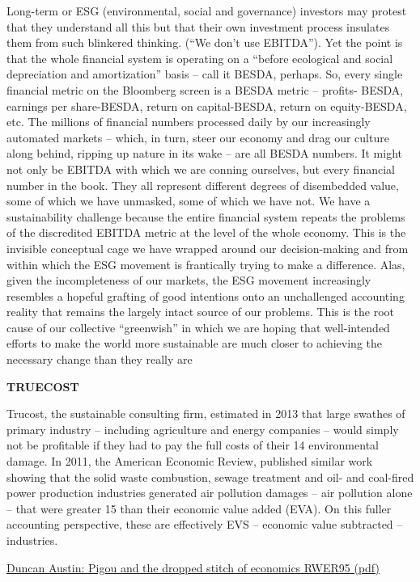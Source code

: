 \documentclass[
]{book}
\begin{document}
Long-term or ESG (environmental, social and governance) investors may protest that they
understand all this but that their own investment process insulates them from such blinkered
thinking. (``We don't use EBITDA''). Yet the point is that the whole financial system is
operating on a ``before ecological and social depreciation and amortization'' basis -- call it
BESDA, perhaps.
So, every single financial metric on the Bloomberg screen is a BESDA metric -- profits-
BESDA, earnings per share-BESDA, return on capital-BESDA, return on equity-BESDA, etc.
The millions of financial numbers processed daily by our increasingly automated markets --
which, in turn, steer our economy and drag our culture along behind, ripping up nature in its
wake -- are all BESDA numbers. It might not only be EBITDA with which we are conning
ourselves, but every financial number in the book. They all represent different degrees of
disembedded value, some of which we have unmasked, some of which we have not.
We have a sustainability challenge because the entire financial system repeats the problems
of the discredited EBITDA metric at the level of the whole economy. This is the invisible
conceptual cage we have wrapped around our decision-making and from within which the
ESG movement is frantically trying to make a difference. Alas, given the incompleteness of
our markets, the ESG movement increasingly resembles a hopeful grafting of good intentions
onto an unchallenged accounting reality that remains the largely intact source of our
problems. This is the root cause of our collective ``greenwish'' in which we are hoping that
well-intended efforts to make the world more sustainable are much closer to achieving the
necessary change than they really are

\textbf{TRUECOST}

Trucost, the sustainable consulting
firm, estimated in 2013 that large swathes of primary industry -- including agriculture and
energy companies -- would simply not be profitable if they had to pay the full costs of their
14
environmental damage. In 2011, the American Economic Review, published similar work
showing that the solid waste combustion, sewage treatment and oil- and coal-fired power
production industries generated air pollution damages -- air pollution alone -- that were greater
15
than their economic value added (EVA). On this fuller accounting perspective, these are
effectively EVS -- economic value subtracted -- industries.

\href{pdf/Austin_2021_Pigou_\%20and_the_dropped_stitch_of_economics_RWER95.pdf}{Duncan Austin: Pigou and the dropped stitch of economics RWER95 (pdf)}
\end{document}

